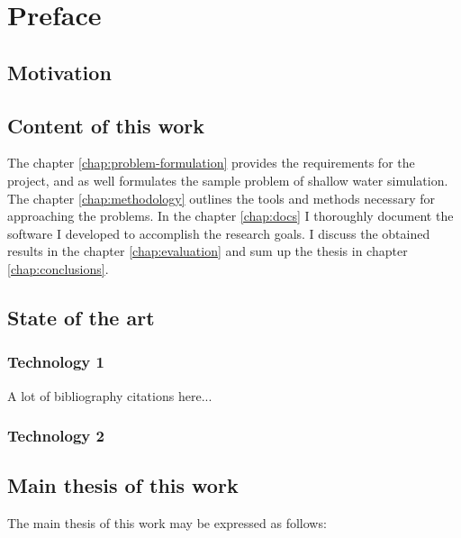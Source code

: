 
\chapter{Preface}

\section{Motivation}

\bt

\section{Content of this work}

\bt

The chapter \ref{chap:problem-formulation} provides the requirements for the project,
and as well formulates the sample problem of shallow water simulation.
The chapter \ref{chap:methodology} outlines the tools and methods necessary for approaching the problems.
In the chapter \ref{chap:docs} I thoroughly document the software I developed to accomplish the research goals.
I discuss the obtained results in the chapter \ref{chap:evaluation} and sum up the thesis in chapter \ref{chap:conclusions}.


\section{State of the art}

\subsection{Technology 1}

A lot of bibliography citations here...

\bt

\subsection{Technology 2}

\bt

\section{Main thesis of this work}

The main thesis of this work may be expressed as follows:

\medskip

\textit{
	\bt
}

